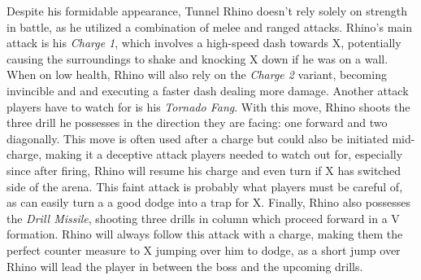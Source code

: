 Despite his formidable appearance, Tunnel Rhino doesn't rely solely on strength in battle, as he utilized a combination of melee and ranged attacks. Rhino's main attack is his \emph{Charge 1}, which involves  a high-speed dash towards X, potentially causing the surroundings to shake and knocking X down if he was on a wall. When on low health, Rhino will also rely on the \emph{Charge 2} variant, becoming invincible and and executing a faster dash dealing more damage. Another attack players have to watch for is his \emph{Tornado Fang}. With this move, Rhino shoots the three drill he possesses in the direction they are facing: one forward and two diagonally. This move is often used after a charge but could also be initiated mid-charge, making it a deceptive attack players needed to watch out for, especially since after firing, Rhino will resume his charge and even turn if X has switched side of the arena. This faint attack is probably what players must be careful of, as can easily turn a a good dodge into a trap for X. Finally, Rhino also possesses the \emph{Drill Missile}, shooting three drills in column which proceed forward in a V formation. Rhino will always follow this attack with a charge, making them the perfect counter measure to X jumping over him to dodge, as a short jump over Rhino will lead the player in between the boss and the upcoming drills.

